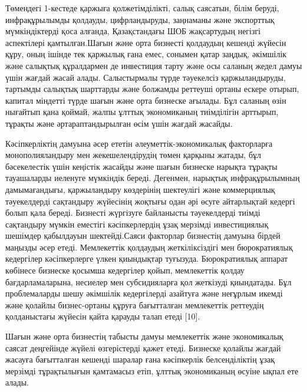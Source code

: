 \begin{multicols}{2}
Төмендегі 1-кестеде қаржыға қолжетімділікті, салық саясатын, білім
беруді, инфрақұрылымды қолдауды, цифрландыруды, заңнаманы және
экспорттық мүмкіндіктерді қоса алғанда, Қазақстандағы ШОБ жақсартудың
негізгі аспектілері қамтылған.Шағын және орта бизнесті қолдаудың кешенді
жүйесін құру, оның ішінде тек қаржылық ғана емес, сонымен қатар заңдық,
әкімшілік және салықтық құралдармен де инвестиция тарту және осы саланың
жедел дамуы үшін жағдай жасай алады. Салыстырмалы түрде тәуекелсіз
қаржыландыруды, тартымды салықтық шарттарды және болжамды реттеуші
ортаны ескере отырып, капитал міндетті түрде шағын және орта бизнеске
ағылады. Бұл саланың өзін нығайтып қана қоймай, жалпы ұлттық
экономиканың тиімділігін арттырып, тұрақты және әртараптандырылған өсім
үшін жағдай жасайды.

Кәсіпкерліктің дамуына әсер ететін әлеуметтік-экономикалық факторларға
монополияландыру мен жекешелендірудің төмен қарқыны жатады, бұл
бәсекелестік үшін кеңістік жасайды және шағын бизнеске нарықта тұрақты
тауашаларды иеленуге мүмкіндік береді. Дегенмен, нарықтық
инфрақұрылымның дамымағандығы, қаржыландыру көздерінің шектеулігі және
коммерциялық тәуекелдерді сақтандыру жүйесінің жоқтығы одан әрі өсуге
айтарлықтай кедергі болып қала береді. Бизнесті жүргізуге байланысты
тәуекелдерді тиімді сақтандыру мүмкін еместігі кәсіпкерлердің ұзақ
мерзімді инвестициялық шешімдер қабылдауын шектейді.Саяси факторлар
бизнестің дамуына бірдей маңызды әсер етеді. Мемлекеттік қолдаудың
жеткіліксіздігі мен бюрократиялық кедергілер кәсіпкерлерге үлкен
қиындықтар туғызуда. Бюрократиялық аппарат көбінесе бизнеске қосымша
кедергілер қойып, мемлекеттік қолдау бағдарламаларына, несиелер мен
субсидияларға қол жеткізуді қиындатады. Бұл проблемаларды шешу әкімшілік
кедергілерді азайтуға және неғұрлым икемді және қолайлы бизнес-ортаны
құруға бағытталған мемлекеттік реттеудің қолданыстағы жүйесін қайта
қарауды талап етеді {[}10{]}.

Шағын және орта бизнестің табысты дамуы мемлекеттік және экономикалық
саясат деңгейінде жүйелі өзгерістерді қажет етеді. Бизнеске қолайлы
жағдай жасауға бағытталған кешенді шаралар ғана кәсіпкерлік
белсенділіктің ұзақ мерзімді тұрақтылығын қамтамасыз етіп, ұлттық
экономиканың өсуіне ықпал ете алады.


\end{multicols}
